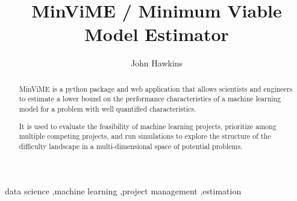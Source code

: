 \documentclass[preprint,12pt, a4paper]{elsarticle}
\begin{document}
\begin{frontmatter}



\title{MinViME / Minimum Viable Model Estimator}


\author{John Hawkins}

\address{}

\begin{abstract}
MinViME is a python package and web application that allows scientists and engineers
to estimate a lower bound on the performance characteristics of a machine
learning model for a problem with well quantified characteristics. 

It is used to evaluate the feasibility of machine learning projects, 
prioritize among multiple competing projects, and run simulations to explore the
structure of the difficulty landscape in a multi-dimensional 
space of potential problems.

\end{abstract}

\begin{keyword}
data science \sep machine learning \sep project management \sep estimation



\end{keyword}

\end{frontmatter}
\end{document}
